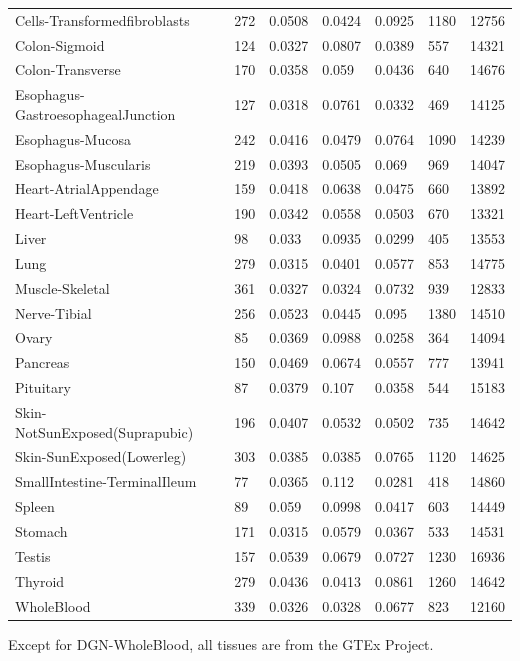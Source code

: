 \documentclass[10pt,letterpaper]{article}
\begin{document}
\begin{table}[!ht]
\begin{adjustwidth}{-2.25in}{0in}
\begin{tabular}{lllllll}
  Cells-Transformedfibroblasts & 272 & 0.0508 & 0.0424 & 0.0925 & 1180 & 12756 \\ 
  Colon-Sigmoid & 124 & 0.0327 & 0.0807 & 0.0389 & 557 & 14321 \\ 
  Colon-Transverse & 170 & 0.0358 & 0.059 & 0.0436 & 640 & 14676 \\ 
  Esophagus-GastroesophagealJunction & 127 & 0.0318 & 0.0761 & 0.0332 & 469 & 14125 \\ 
  Esophagus-Mucosa & 242 & 0.0416 & 0.0479 & 0.0764 & 1090 & 14239 \\ 
  Esophagus-Muscularis & 219 & 0.0393 & 0.0505 & 0.069 & 969 & 14047 \\ 
  Heart-AtrialAppendage & 159 & 0.0418 & 0.0638 & 0.0475 & 660 & 13892 \\ 
  Heart-LeftVentricle & 190 & 0.0342 & 0.0558 & 0.0503 & 670 & 13321 \\ 
  Liver & 98 & 0.033 & 0.0935 & 0.0299 & 405 & 13553 \\ 
  Lung & 279 & 0.0315 & 0.0401 & 0.0577 & 853 & 14775 \\ 
  Muscle-Skeletal & 361 & 0.0327 & 0.0324 & 0.0732 & 939 & 12833 \\ 
  Nerve-Tibial & 256 & 0.0523 & 0.0445 & 0.095 & 1380 & 14510 \\ 
  Ovary & 85 & 0.0369 & 0.0988 & 0.0258 & 364 & 14094 \\ 
  Pancreas & 150 & 0.0469 & 0.0674 & 0.0557 & 777 & 13941 \\ 
  Pituitary & 87 & 0.0379 & 0.107 & 0.0358 & 544 & 15183 \\ 
  Skin-NotSunExposed(Suprapubic) & 196 & 0.0407 & 0.0532 & 0.0502 & 735 & 14642 \\ 
  Skin-SunExposed(Lowerleg) & 303 & 0.0385 & 0.0385 & 0.0765 & 1120 & 14625 \\ 
  SmallIntestine-TerminalIleum & 77 & 0.0365 & 0.112 & 0.0281 & 418 & 14860 \\ 
  Spleen & 89 & 0.059 & 0.0998 & 0.0417 & 603 & 14449 \\ 
  Stomach & 171 & 0.0315 & 0.0579 & 0.0367 & 533 & 14531 \\ 
  Testis & 157 & 0.0539 & 0.0679 & 0.0727 & 1230 & 16936 \\ 
  Thyroid & 279 & 0.0436 & 0.0413 & 0.0861 & 1260 & 14642 \\ 
  WholeBlood & 339 & 0.0326 & 0.0328 & 0.0677 & 823 & 12160 \\ 
   \hline
\end{tabular}
\begin{flushleft} Except for DGN-WholeBlood, all tissues are from the GTEx Project.
\end{flushleft}
\label{table-h2}
\end{adjustwidth}
\end{table}
\end{document}

